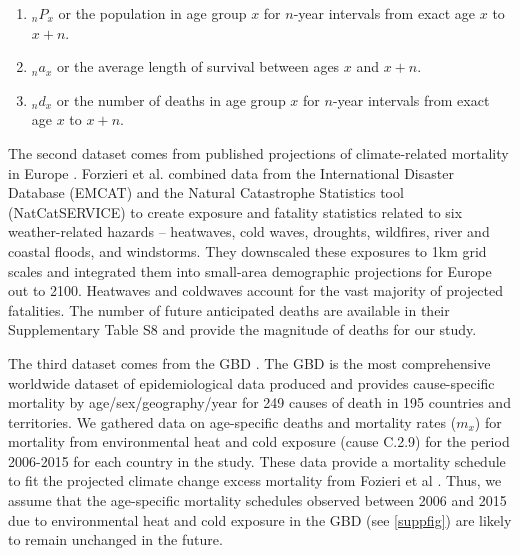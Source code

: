 \documentclass[12pt,]{article}
\begin{document}
\begin{enumerate}
\item $_nP_x$ or the population in age group $x$ for $n$-year intervals from exact age $x$ to $x+n$.
\item $_na_x$ or the average length of survival between ages $x$ and $x+n$.
\item $_nd_x$ or the number of deaths in age group $x$ for $n$-year intervals from exact age $x$ to $x+n$.
\end{enumerate}

The second dataset comes from published projections of climate-related
mortality in Europe \citep{forzieri2017increasing}. Forzieri et al.
\citep{forzieri2017increasing} combined data from the International
Disaster Database (EMCAT) and the Natural Catastrophe Statistics tool
(NatCatSERVICE) to create exposure and fatality statistics related to
six weather-related hazards -- heatwaves, cold waves, droughts,
wildfires, river and coastal floods, and windstorms. They downscaled
these exposures to 1km grid scales and integrated them into small-area
demographic projections for Europe out to 2100. Heatwaves and coldwaves
account for the vast majority of projected fatalities. The number of
future anticipated deaths are available in their Supplementary Table S8
\citep{forzieri2017increasing} and provide the magnitude of deaths for
our study.

The third dataset comes from the GBD \citep{GBD, wang2012age}. The GBD
is the most comprehensive worldwide dataset of epidemiological data
produced and provides cause-specific mortality by age/sex/geography/year
for 249 causes of death in 195 countries and territories. We gathered
data on age-specific deaths and mortality rates (\(m_x\)) for mortality
from environmental heat and cold exposure (cause C.2.9) for the period
2006-2015 for each country in the study. These data provide a mortality
schedule to fit the projected climate change excess mortality from
Fozieri et al \citep{forzieri2017increasing}. Thus, we assume that the
age-specific mortality schedules observed between 2006 and 2015 due to
environmental heat and cold exposure in the GBD (see \autoref{suppfig})
are likely to remain unchanged in the future.
\end{document}
